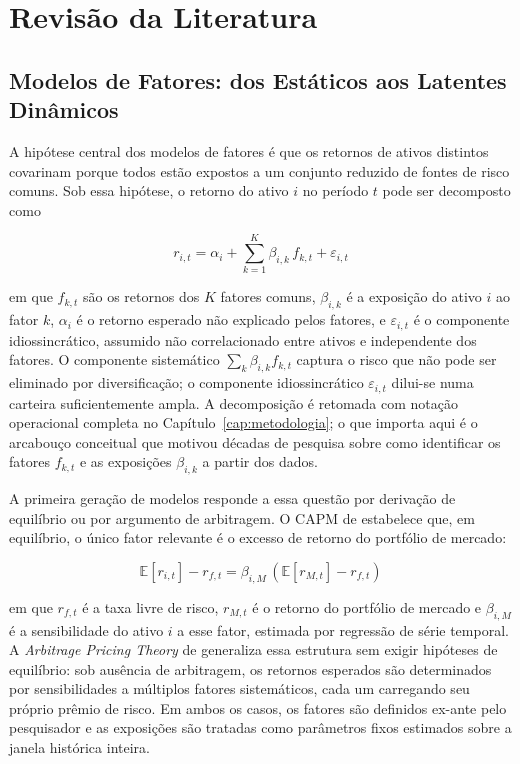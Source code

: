 \chapter{Revisão da Literatura}
\label{cap:revisao}

\section{Modelos de Fatores: dos Estáticos aos Latentes Dinâmicos}
\label{sec:modelos-fatores}

A hipótese central dos modelos de fatores é que os retornos de ativos distintos covarinam porque
todos estão expostos a um conjunto reduzido de fontes de risco comuns. Sob essa hipótese, o retorno
do ativo $i$ no período $t$ pode ser decomposto como

\begin{equation}
    r_{i,t} = \alpha_i + \sum_{k=1}^{K} \beta_{i,k}\, f_{k,t} + \varepsilon_{i,t}
    \label{eq:modelo-fatorial}
\end{equation}

\noindent em que $f_{k,t}$ são os retornos dos $K$ fatores comuns, $\beta_{i,k}$ é a exposição do
ativo $i$ ao fator $k$, $\alpha_i$ é o retorno esperado não explicado pelos fatores, e
$\varepsilon_{i,t}$ é o componente idiossincrático, assumido não correlacionado entre ativos e
independente dos fatores. O componente sistemático $\sum_k \beta_{i,k} f_{k,t}$ captura o risco que
não pode ser eliminado por diversificação; o componente idiossincrático $\varepsilon_{i,t}$ dilui-se
numa carteira suficientemente ampla. A decomposição é retomada com notação operacional completa no
Capítulo~\ref{cap:metodologia}; o que importa aqui é o arcabouço conceitual que motivou décadas de
pesquisa sobre como identificar os fatores $f_{k,t}$ e as exposições $\beta_{i,k}$ a partir dos
dados.

A primeira geração de modelos responde a essa questão por derivação de equilíbrio ou por argumento
de arbitragem. O CAPM de \textcite{sharpe1964} estabelece que, em equilíbrio, o único fator
relevante é o excesso de retorno do portfólio de mercado:

\begin{equation}
    \mathbb{E}[r_{i,t}] - r_{f,t} = \beta_{i,M}\,\!\left(\mathbb{E}[r_{M,t}] - r_{f,t}\right)
    \label{eq:capm}
\end{equation}

\noindent em que $r_{f,t}$ é a taxa livre de risco, $r_{M,t}$ é o retorno do portfólio de mercado e
$\beta_{i,M}$ é a sensibilidade do ativo $i$ a esse fator, estimada por regressão de série
temporal. A \textit{Arbitrage Pricing Theory} de \textcite{ross1976} generaliza essa estrutura sem
exigir hipóteses de equilíbrio: sob ausência de arbitragem, os retornos esperados são determinados
por sensibilidades a múltiplos fatores sistemáticos, cada um carregando seu próprio prêmio de
risco. Em ambos os casos, os fatores são definidos ex-ante pelo pesquisador e as exposições são
tratadas como parâmetros fixos estimados sobre a janela histórica inteira.

